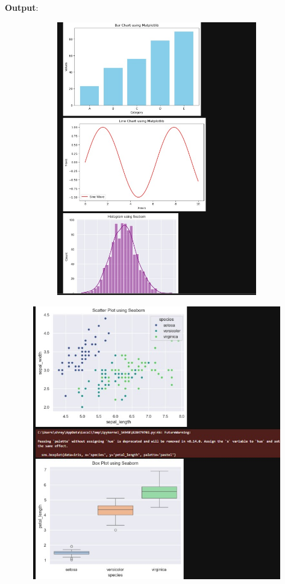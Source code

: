 \documentclass{article}
\begin{document}
\textbf{Output}:

\includegraphics[width=14cm,height=12cm]{Matplotlib_Output.jpeg}

\includegraphics[width=14cm,height=12cm]{Matplotlib_Output2.jpeg}
\end{document}
